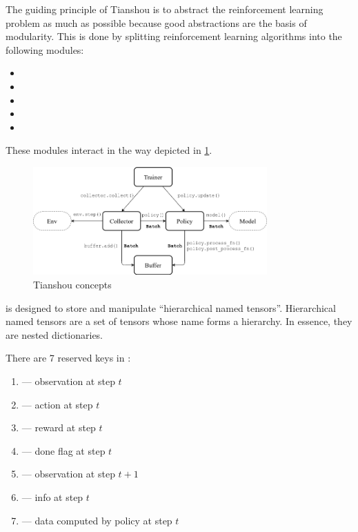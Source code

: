 The guiding principle of Tianshou is to abstract the reinforcement learning problem
as much as possible because good abstractions are the basis of modularity.
This is done by splitting reinforcement learning algorithms into the following modules:
\begin{itemize}
		\item {}
		\item {}
		\item {}
		\item {}
		\item {}
\end{itemize}

These modules interact in the way depicted in \ref{tianshouconcepts}.

\begin{figure}[htpb]
		\centering
		\includegraphics[width=0.8\textwidth]{"./figure/concepts_arch2.png"}
		\caption{Tianshou concepts}
		\label{tianshouconcepts}
\end{figure}


 is designed to store and manipulate ``hierarchical named tensors''.
Hierarchical named tensors are a set of tensors whose name forms a hierarchy.
In essence, they are nested dictionaries.

There are 7 reserved keys in :
\begin{enumerate}
		\item {} --- observation at step $ t  $
		\item {} --- action at step $ t  $
		\item {} --- reward at step $ t  $
		\item {} --- done flag at step $ t  $
		\item {} --- observation at step $ t+1  $
		\item {} --- info at step $ t  $
		\item {} --- data computed by policy at step $ t  $
\end{enumerate}

